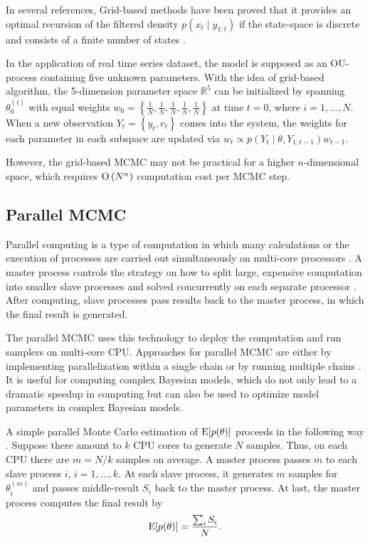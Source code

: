 In several references, Grid-based methods have been proved that it provides an optimal recursion of the filtered density $p(x_t\mid y_{1:t})$ if the state-space is discrete and consists of a finite number of states \citep{ristic2004beyond, stroud2018bayesian, arulampalam2002tutorial, hartmann2016grid}. 

In the application of real time series dataset, the model is supposed as an OU-process containing five unknown parameters. With the idea of grid-based algorithm, the 5-dimension parameter space $\mathbb{R}^5$ can be initialized by spanning $\theta_0^{(i)}$ with equal weights $w_0=\left\lbrace\frac{1}{N},\frac{1}{N},\frac{1}{N},\frac{1}{N},\frac{1}{N}\right\rbrace$ at time $t=0$, where $i=1,\ldots,N$. When a new observation $Y_t=\left\lbrace y_t,v_t\right\rbrace$ comes into the system, the weights for each parameter in each subspace are updated via $w_t\propto p(Y_t\mid \theta,Y_{1:t-1})w_{t-1}$. 

However, the grid-based MCMC may not be practical for a higher $n$-dimensional space, which requires ${\rm O}\left(N^n\right)$ computation cost per MCMC step. 


\subsection*{Parallel MCMC}

Parallel computing is a type of computation in which many calculations or the execution of processes are carried out simultaneously on multi-core processors \citep{asanovic2006landscape}. A master process controls the strategy on how to split large, expensive computation into smaller slave processes and solved concurrently on each separate processor \citep{Almasi1994Highly}. After computing, slave processes pass results back to the master process, in which the final result is generated. 

The parallel MCMC uses this technology to deploy the computation and run samplers on multi-core CPU. Approaches for parallel MCMC are either by implementing parallelization within a single chain or by running multiple chains \citep{wu2012parallel}. It is useful for computing complex Bayesian models, which do not only lead to a dramatic speedup in computing but can also be used to optimize model parameters in complex Bayesian models.

A simple parallel Monte Carlo estimation of $\mathrm{E}\lbrack p(\theta)\rbrack$ proceeds in the following way \citep{kontoghiorghes2005handbook}. Suppose there amount to $k$ CPU cores to generate $N$ samples. Thus, on each CPU there are $m=N/k$ samples on average. A master process passes $m$ to each slave process $i$, $i=1,\ldots,k$. At each slave process, it generates $m$ samples for $\theta_i^{(m)}$ and passes middle-result $S_i$ back to the master process. At last, the master process computes the final result by 
\begin{equation}
\mathrm{E}\lbrack p(\theta)\rbrack=\frac{\sum_i S_i}{N}. 
\end{equation}

